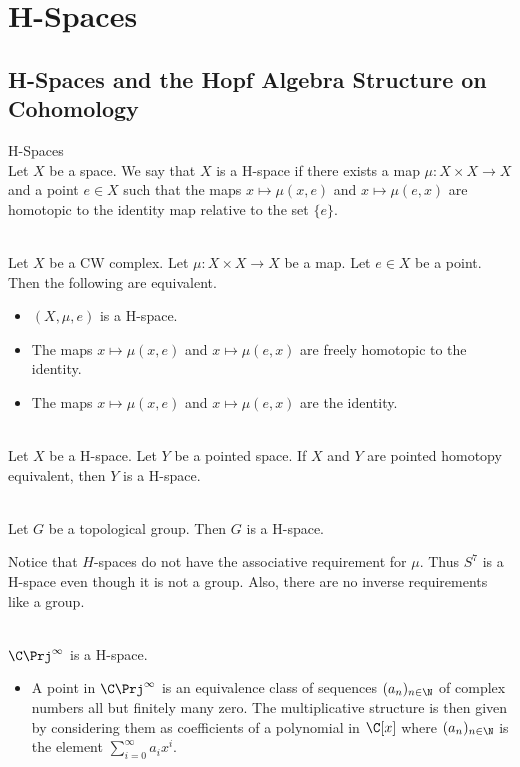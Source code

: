 \documentclass[a4paper]{article}
\begin{document}
\pagebreak
\section{H-Spaces}
\subsection{H-Spaces and the Hopf Algebra Structure on Cohomology}
\begin{defn}{H-Spaces}{}\\
Let $X$ be a space. We say that $X$ is a H-space if there exists a map $\mu:X\times X\to X$ and a point $e\in X$ such that the maps $x\mapsto\mu(x,e)$ and $x\mapsto\mu(e,x)$ are homotopic to the identity map relative to the set $\{e\}$. 
\end{defn}

\begin{prp}{}{}\\
Let $X$ be a CW complex. Let $\mu:X\times X\to X$ be a map. Let $e\in X$ be a point. Then the following are equivalent. 
\begin{itemize}
\item $(X,\mu,e)$ is a H-space. 
\item The maps $x\mapsto\mu(x,e)$ and $x\mapsto\mu(e,x)$ are freely homotopic to the identity. 
\item The maps $x\mapsto\mu(x,e)$ and $x\mapsto\mu(e,x)$ are the identity. 
\end{itemize}
\end{prp}

\begin{prp}{}{}\\
Let $X$ be a H-space. Let $Y$ be a pointed space. If $X$ and $Y$ are pointed homotopy equivalent, then $Y$ is a H-space. 
\end{prp}

\begin{eg}{}{}\\
Let $G$ be a topological group. Then $G$ is a H-space. 
\end{eg}

Notice that $H$-spaces do not have the associative requirement for $\mu$. Thus $S^7$ is a H-space even though it is not a group. Also, there are no inverse requirements like a group. 

\begin{eg}{}{}\\
$\C\Prj^\infty$ is a H-space. 
\begin{itemize}
\item A point in $\C\Prj^\infty$ is an equivalence class of sequences $(a_n)_{n\in\N}$ of complex numbers all but finitely many zero. The multiplicative structure is then given by considering them as coefficients of a polynomial in $\C[x]$ where $(a_n)_{n\in\N}$ is the element $\sum_{i=0}^\infty a_ix^i$. 
\end{itemize}
\end{eg}
\end{document}

